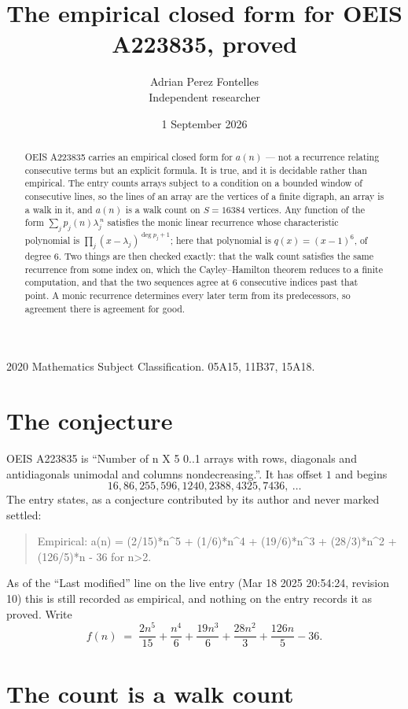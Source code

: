\documentclass[11pt,a4paper]{article}
\title{The empirical closed form for OEIS A223835, proved}
\author{Adrian Perez Fontelles\\ \small Independent researcher}
\date{1 September 2026}
\theoremstyle{plain}
\theoremstyle{definition}
\begin{document}
\maketitle

\begin{abstract}
OEIS A223835 carries an empirical closed form for $a(n)$ --- not a recurrence relating
consecutive terms but an explicit formula. It is true, and it is decidable rather than
empirical. The entry counts arrays subject to a condition on a bounded window of consecutive lines, so the lines of an array are the
vertices of a finite digraph, an array is a walk in it, and $a(n)$ is a walk count on
$S=16384$ vertices. Any function of the form $\sum_j p_j(n)\lambda_j^{\,n}$ satisfies the
monic linear recurrence whose characteristic polynomial is
$\prod_j(x-\lambda_j)^{\deg p_j+1}$; here that polynomial is $q(x)=(x-1)^{6}$, of degree
$6$. Two things are then checked exactly: that the walk count satisfies the same
recurrence from some index on, which the Cayley--Hamilton theorem reduces to a finite
computation, and that the two sequences agree at $6$ consecutive indices past that
point. A monic recurrence determines every later term from its predecessors, so agreement
there is agreement for good.
\end{abstract}

\noindent\small 2020 Mathematics Subject Classification. 05A15, 11B37, 15A18.\normalsize

\section{The conjecture}

OEIS A223835 is ``Number of n X 5 0..1 arrays with rows, diagonals and antidiagonals unimodal and columns nondecreasing.''. It has offset $1$ and begins
\[
16, 86, 255, 596, 1240, 2388, 4325, 7436,\ \dots
\]
The entry states, as a conjecture contributed by its author and never marked settled:
\begin{quote}
Empirical: a(n) = (2/15)*n\^{}5 + (1/6)*n\^{}4 + (19/6)*n\^{}3 + (28/3)*n\^{}2 + (126/5)*n - 36 for n>2.
\end{quote}
As of the ``Last modified'' line on the live entry (Mar 18 2025 20:54:24, revision 10) this is still
recorded as empirical, and nothing on the entry records it as proved. Write
\[
f(n)\;=\;\frac{2 n^{5}}{15} + \frac{n^{4}}{6} + \frac{19 n^{3}}{6} + \frac{28 n^{2}}{3} + \frac{126 n}{5} - 36.
\]

\section{The count is a walk count}
\end{document}
